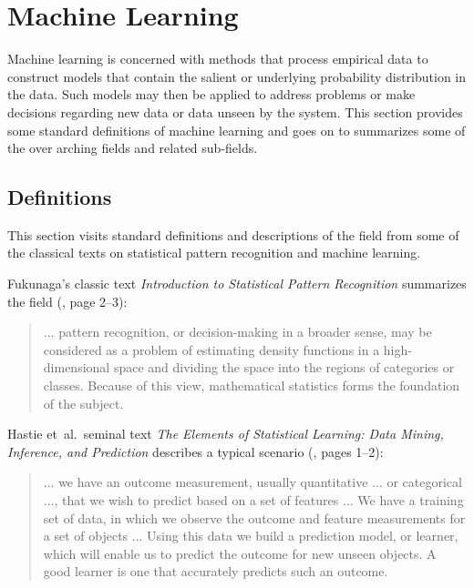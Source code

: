 

\section{Machine Learning} 
\label{intro:machinelearning}

Machine learning is concerned with methods that process empirical data to construct models that contain the salient or underlying probability distribution in the data. Such models may then be applied to address problems or make decisions regarding new data or data unseen by the system.
This section provides some standard definitions of machine learning and goes on to summarizes some of the over arching fields and related sub-fields.

\subsection{Definitions}
\label{subsec:definitions}
This section visits standard definitions and descriptions of the field from some of the classical texts on statistical pattern recognition and machine learning. 

Fukunaga's classic text \emph{Introduction to Statistical Pattern Recognition} summarizes the field (\cite{Fukunaga1990}, page 2--3):

\begin{quotation}
... pattern recognition, or decision-making in a broader sense, may be considered as a problem of estimating density functions in a high-dimensional space and dividing the space into the regions of categories or classes. Because of this view, mathematical statistics forms the foundation of the subject.
\end{quotation} 

Hastie et~al.\ seminal text \emph{The Elements of Statistical Learning: Data Mining, Inference, and Prediction} describes a typical scenario (\cite{Hastie2009}, pages 1--2):

\begin{quotation}
... we have an outcome measurement, usually quantitative ... or categorical ..., that we wish to predict based on a set of features ... We have a training set of data, in which we observe the outcome and feature measurements for a set of objects ... Using this data we build a prediction model, or learner, which will enable us to predict the outcome for new unseen objects. A good learner is one that accurately predicts such an outcome.
\end{quotation} 

